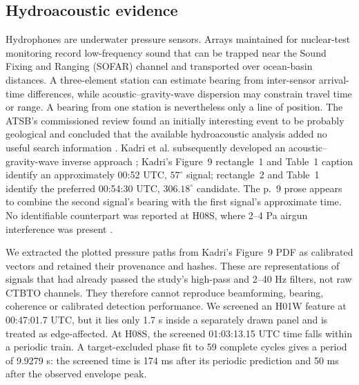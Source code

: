 \subsection{Hydroacoustic evidence}
\label{sec:hydroacoustics}

Hydrophones are underwater pressure sensors. Arrays maintained for nuclear-test
monitoring record low-frequency sound that can be trapped near the Sound Fixing
and Ranging (SOFAR) channel and transported over ocean-basin distances. A
three-element station can estimate bearing from inter-sensor arrival-time
differences, while acoustic--gravity-wave dispersion may constrain travel time
or range. A bearing from one station is nevertheless only a line of position.
The ATSB's commissioned review found an initially interesting event to be
probably geological and concluded that the available hydroacoustic analysis
added no useful search information \citep{ATSB2017}. Kadri et al. subsequently
developed an acoustic--gravity-wave inverse approach \citep{KadriEtAl2017};
Kadri's Figure~9 rectangle~1 and Table~1 caption identify an approximately
00:52 UTC, $57^\circ$ signal; rectangle~2 and Table~1 identify the preferred
00:54:30 UTC, $306.18^\circ$ candidate. The p.~9 prose appears to combine the
second signal's bearing with the first signal's approximate time. No identifiable counterpart was reported at H08S, where 2--4 Pa
airgun interference was present \citep{Kadri2024}.

We extracted the plotted pressure paths from Kadri's Figure~9 PDF as calibrated
vectors and retained their provenance and hashes. These are representations of
signals that had already passed the study's high-pass and 2--40 Hz filters, not
raw CTBTO channels. They therefore cannot reproduce beamforming, bearing,
coherence or calibrated detection performance. We screened an H01W feature at
00:47:01.7 UTC, but it lies only 1.7 s inside a separately drawn panel and is
treated as edge-affected. At H08S, the screened 01:03:13.15 UTC time falls
within a periodic train. A target-excluded phase fit to 59 complete cycles gives
a period of 9.9279 s: the screened time is 174 ms after its periodic prediction
and 50 ms after the observed envelope peak.

